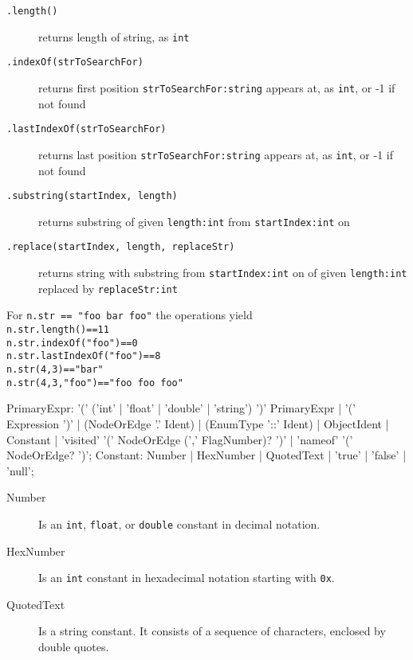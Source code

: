 \begin{description}
\item[\texttt{.length()}] returns length of string, as \texttt{int}
\item[\texttt{.indexOf(strToSearchFor)}] returns first position \texttt{strToSearchFor:string} appears at, as \texttt{int}, or -1 if not found
\item[\texttt{.lastIndexOf(strToSearchFor)}] returns last position \texttt{strToSearchFor:string} appears at, as \texttt{int}, or -1 if not found
\item[\texttt{.substring(startIndex, length)}] returns substring of given \texttt{length:int} from \texttt{startIndex:int} on
\item[\texttt{.replace(startIndex, length, replaceStr)}] returns string with substring from \texttt{startIndex:int} on of given \texttt{length:int} replaced by \texttt{replaceStr:int}
\end{description}

\begin{example}
For \texttt{n.str == "foo bar foo"} the operations yield \\
\texttt{n.str.length()==11} \\
\texttt{n.str.indexOf("foo")==0} \\
\texttt{n.str.lastIndexOf("foo")==8} \\
\texttt{n.str(4,3)=="bar"} \\
\texttt{n.str(4,3,"foo")=="foo foo foo"} \\
\end{example}

\begin{rail} 
  PrimaryExpr: '(' ('int' | 'float' | 'double' | 'string') ')' PrimaryExpr | '(' Expression ')' | (NodeOrEdge '.' Ident) | (EnumType '::' Ident) | ObjectIdent | Constant | 'visited' '(' NodeOrEdge (',' FlagNumber)? ')' | 'nameof' '(' NodeOrEdge? ')';
  Constant: Number | HexNumber | QuotedText | 'true' | 'false' | 'null';
\end{rail}
\begin{description}
  \item[Number] Is an \texttt{int}, \texttt{float}, or \texttt{double} constant in decimal notation.
  \item[HexNumber] Is an \texttt{int} constant in hexadecimal notation starting with \texttt{0x}.
  \item[QuotedText] Is a string constant. It consists of a sequence of characters, enclosed by double quotes.
\end{description}

